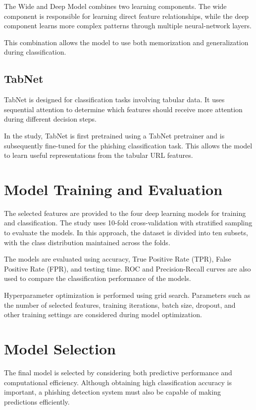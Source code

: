 \documentclass[12pt,a4paper]{report}
\begin{document}
The Wide and Deep Model combines two learning components. The wide component is responsible for learning direct feature relationships, while the deep component learns more complex patterns through multiple neural-network layers.

This combination allows the model to use both memorization and generalization during classification.

\subsection{TabNet}

TabNet is designed for classification tasks involving tabular data. It uses sequential attention to determine which features should receive more attention during different decision steps.

In the study, TabNet is first pretrained using a TabNet pretrainer and is subsequently fine-tuned for the phishing classification task. This allows the model to learn useful representations from the tabular URL features.

\section{Model Training and Evaluation}

The selected features are provided to the four deep learning models for training and classification. The study uses 10-fold cross-validation with stratified sampling to evaluate the models. In this approach, the dataset is divided into ten subsets, with the class distribution maintained across the folds.

The models are evaluated using accuracy, True Positive Rate (TPR), False Positive Rate (FPR), and testing time. ROC and Precision-Recall curves are also used to compare the classification performance of the models.

Hyperparameter optimization is performed using grid search. Parameters such as the number of selected features, training iterations, batch size, dropout, and other training settings are considered during model optimization.

\section{Model Selection}

The final model is selected by considering both predictive performance and computational efficiency. Although obtaining high classification accuracy is important, a phishing detection system must also be capable of making predictions efficiently.
\end{document}
